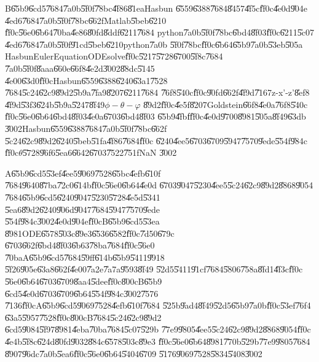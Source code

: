 \bigskip

B\U{65b9}\U{6cd5}\U{7684}\U{7a0b}\U{5f0f}\U{78bc}\U{4f86}\U{81ea}Hasbun%
\U{6559}\U{6388}\U{7684}\U{8457}\U{4f5c}\cite{hasbun}\U{ff0c}\U{4e0d}\U{904e}%
\U{4ed6}\U{7684}\U{7a0b}\U{5f0f}\U{78bc}\U{662f}Matlab\U{5beb}\U{6210}%
\U{ff0c}\U{56e0}\U{6b64}\U{70ba}\U{4e86}\U{80fd}\U{8ddf}\U{6211}\U{7684}%
python\U{7a0b}\U{5f0f}\U{78bc}\U{6bd4}\U{8f03}\U{ff0c}\U{6211}\U{5c07}%
\U{4ed6}\U{7684}\U{7a0b}\U{5f0f}\U{91cd}\U{5beb}\U{6210}python\U{7a0b}%
\U{5f0f}\U{78bc}\U{ff0c}\U{6b64}\U{65b9}\U{7a0b}\U{53eb}\U{505a}%
HasbunEulerEquationODEsolve\U{ff0c}\U{5217}\U{5728}\U{6700}\U{5f8c}\U{7684}%
\U{7a0b}\U{5f0f}\U{8aaa}\U{660e}\U{66f8}\U{4e2d}\U{3002}\U{88dc}\U{5145}%
\U{4e00}\U{63d0}\U{ff0c}Hasbun\U{6559}\U{6388}\U{6240}\U{63a1}\U{7528}%
\U{7684}\U{5c24}\U{62c9}\U{89d2}\U{5b9a}\U{7fa9}\U{8207}\U{6211}\U{7684}%
\U{76f8}\U{540c}\U{ff0c}\U{90fd}\U{662f}\U{4f9d}\U{7167}z-x'-z'\U{8ef8}%
\U{4f9d}\U{53f3}\U{624b}\U{5b9a}\U{5247}\U{8f49}$\phi -\theta -\varphi $%
\U{89d2}\U{ff0c}\U{4e5f}\U{8207}Goldstein\U{66f8}\U{4e0a}\U{76f8}\U{540c}%
\U{ff0c}\U{56e0}\U{6b64}\U{6bd4}\U{8f03}\U{4e0a}\U{6703}\U{6bd4}\U{8f03}%
\U{65b9}\U{4fbf}\U{ff0c}\U{4e0d}\U{9700}\U{8981}\U{505a}\U{8f49}\U{63db}%
\U{3002}Hasbun\U{6559}\U{6388}\U{7684}\U{7a0b}\U{5f0f}\U{78bc}\U{662f}%
\U{5c24}\U{62c9}\U{89d2}\U{6240}\U{5beb}\U{51fa}\U{4f86}\U{7684}\U{ff0c}%
\U{6240}\U{4ee5}\U{6703}\U{6709}\U{5947}\U{7570}\U{9ede}\U{554f}\U{984c}%
\U{ff0c}$\theta $\U{5728}\U{96f6}\U{5ea6}\U{6642}\U{6703}\U{7522}\U{751f}NaN%
\U{3002}

\bigskip

A\U{65b9}\U{6cd5}\U{53ef}\U{4ee5}\U{9069}\U{7528}\U{65bc}\U{4efb}\U{610f}%
\U{7684}\U{9640}\U{87ba}\U{72c0}\U{614b}\U{ff0c}\U{56e0}\U{6b64}\U{4e0d}%
\U{6703}\U{9047}\U{5230}\U{4ee5}\U{5c24}\U{62c9}\U{89d2}\U{8868}\U{9054}%
\U{7684}\U{65b9}\U{6cd5}\U{6240}\U{9047}\U{5230}\U{5728}\U{4e5d}\U{5341}%
\U{5ea6}\U{89d2}\U{6240}\U{906d}\U{9047}\U{7684}\U{5947}\U{7570}\U{9ede}%
\U{554f}\U{984c}\U{3002}\U{4e0d}\U{904e}\U{ff0c}B\U{65b9}\U{6cd5}\U{53ea}%
\U{8981}ODE\U{6578}\U{503c}\U{89e3}\U{6536}\U{6582}\U{ff0c}\U{7d50}\U{679c}%
\U{6703}\U{662f}\U{6bd4}\U{8f03}\U{6b63}\U{78ba}\U{7684}\U{ff0c}\U{56e0}%
\U{70ba}A\U{65b9}\U{6cd5}\U{7684}\U{59ff}\U{614b}\U{65b9}\U{5411}\U{9918}%
\U{5f26}\U{905e}\U{63a8}\U{662f}\U{4e00}\U{7a2e}\U{7a7a}\U{9593}\U{8f49}%
\U{52d5}\U{5411}\U{91cf}\U{7684}\U{5806}\U{758a}\U{8fd1}\U{4f3c}\U{ff0c}%
\U{56e0}\U{6b64}\U{6703}\U{6709}\U{8aa4}\U{5dee}\U{ff0c}\U{800c}B\U{65b9}%
\U{6cd5}\U{4e0d}\U{6703}\U{6709}\U{6b64}\U{554f}\U{984c}\U{3002}\U{7576}%
\U{7136}\U{ff0c}A\U{65b9}\U{6cd5}\U{9069}\U{7528}\U{4efb}\U{610f}\U{7684}%
\U{525b}\U{9ad4}\U{8f49}\U{52d5}\U{65b9}\U{7a0b}\U{ff0c}\U{53ef}\U{76f4}%
\U{63a5}\U{5957}\U{7528}\U{ff0c}\U{800c}B\U{7684}\U{5c24}\U{62c9}\U{89d2}%
\U{6cd5}\U{9084}\U{5f97}\U{8981}\U{4eba}\U{70ba}\U{7684}\U{5c07}\U{529b}%
\U{77e9}\U{9805}\U{4ee5}\U{5c24}\U{62c9}\U{89d2}\U{8868}\U{9054}\U{ff0c}%
\U{4e4b}\U{5f8c}\U{624d}\U{80fd}\U{9032}\U{884c}\U{6578}\U{503c}\U{89e3}%
\U{ff0c}\U{56e0}\U{6b64}\U{8981}\U{770b}\U{529b}\U{77e9}\U{9805}\U{7684}%
\U{8907}\U{96dc}\U{7a0b}\U{5ea6}\U{ff0c}\U{56e0}\U{6b64}\U{5404}\U{6709}%
\U{5176}\U{9069}\U{7528}\U{5834}\U{5408}\U{3002}

